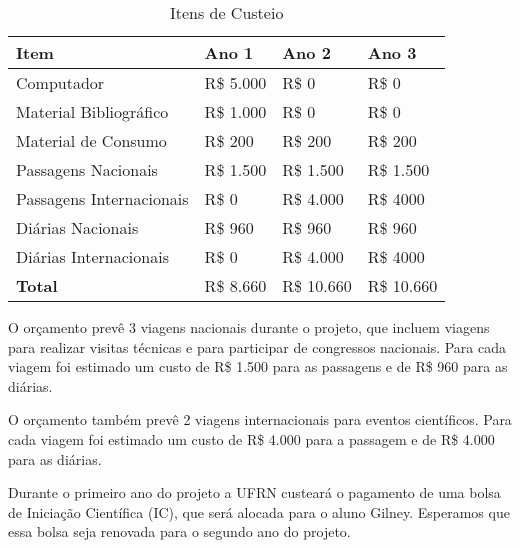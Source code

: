 \documentclass[titlepage,12pt]{article}
\begin{document}
\begin{table}[h]
\centering
\begin{tabular}{|l|l|l|l|} \hline
Item                                           &   Ano 1    &   Ano 2       &   Ano 3     \\ \hline
Computador                                     &  R\$ 5.000  &  R\$      0  &  R\$   0    \\ \hline
Material Bibliográfico                         &  R\$ 1.000  &  R\$      0  &  R\$   0    \\ \hline
Material de Consumo                            &  R\$   200  &  R\$    200  &  R\$ 200    \\ \hline
Passagens Nacionais                            &  R\$ 1.500  &  R\$ 1.500   &  R\$ 1.500  \\ \hline
Passagens Internacionais                       &  R\$     0  &  R\$  4.000  &  R\$ 4000   \\ \hline
Diárias Nacionais                              &  R\$   960  &  R\$    960  &  R\$  960   \\ \hline
Diárias Internacionais                         &  R\$     0  &  R\$  4.000  &  R\$ 4000   \\ \hline
{\bf Total}                                    &  R\$ 8.660  &  R\$ 10.660  &  R\$ 10.660  \\ \hline 
\end{tabular}
\caption{Itens de Custeio}
\label{tab:custeio}
\end{table}


O orçamento prevê 3 viagens nacionais durante o projeto,
que incluem viagens para realizar visitas técnicas e
para participar de congressos nacionais. Para cada
viagem foi estimado um custo de R\$ 1.500 para as
passagens e de R\$ 960 para as diárias.

O orçamento também prevê 2 viagens internacionais
para eventos científicos. Para cada viagem foi
estimado um custo de R\$ 4.000 para a passagem
e de R\$ 4.000 para as diárias.

Durante o primeiro ano do projeto a UFRN custeará o pagamento
de uma bolsa de Iniciação Científica (IC), que será alocada
para o aluno Gilney. Esperamos que essa bolsa seja renovada
para o segundo ano do projeto.




 
\end{document}
